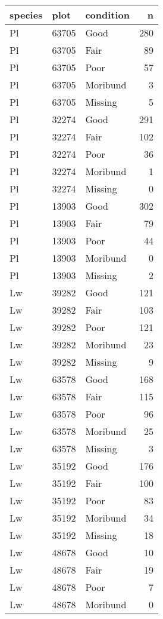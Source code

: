 \documentclass[
]{article}
\begin{document}
\begin{tabular}{l|l|l|r}
\hline
species & plot & condition & n\\
\hline
Pl & 63705 & Good & 280\\
\hline
Pl & 63705 & Fair & 89\\
\hline
Pl & 63705 & Poor & 57\\
\hline
Pl & 63705 & Moribund & 3\\
\hline
Pl & 63705 & Missing & 5\\
\hline
Pl & 32274 & Good & 291\\
\hline
Pl & 32274 & Fair & 102\\
\hline
Pl & 32274 & Poor & 36\\
\hline
Pl & 32274 & Moribund & 1\\
\hline
Pl & 32274 & Missing & 0\\
\hline
Pl & 13903 & Good & 302\\
\hline
Pl & 13903 & Fair & 79\\
\hline
Pl & 13903 & Poor & 44\\
\hline
Pl & 13903 & Moribund & 0\\
\hline
Pl & 13903 & Missing & 2\\
\hline
Lw & 39282 & Good & 121\\
\hline
Lw & 39282 & Fair & 103\\
\hline
Lw & 39282 & Poor & 121\\
\hline
Lw & 39282 & Moribund & 23\\
\hline
Lw & 39282 & Missing & 9\\
\hline
Lw & 63578 & Good & 168\\
\hline
Lw & 63578 & Fair & 115\\
\hline
Lw & 63578 & Poor & 96\\
\hline
Lw & 63578 & Moribund & 25\\
\hline
Lw & 63578 & Missing & 3\\
\hline
Lw & 35192 & Good & 176\\
\hline
Lw & 35192 & Fair & 100\\
\hline
Lw & 35192 & Poor & 83\\
\hline
Lw & 35192 & Moribund & 34\\
\hline
Lw & 35192 & Missing & 18\\
\hline
Lw & 48678 & Good & 10\\
\hline
Lw & 48678 & Fair & 19\\
\hline
Lw & 48678 & Poor & 7\\
\hline
Lw & 48678 & Moribund & 0\\

\end{tabular}
\end{document}
